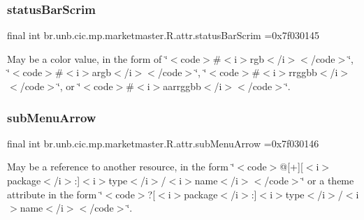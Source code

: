 \subsubsection{\texorpdfstring{status\+Bar\+Scrim}{statusBarScrim}}
{\footnotesize\ttfamily final int br.\+unb.\+cic.\+mp.\+marketmaster.\+R.\+attr.\+status\+Bar\+Scrim =0x7f030145\hspace{0.3cm}{\ttfamily [static]}}

May be a color value, in the form of \char`\"{}$<$code$>$\#$<$i$>$rgb$<$/i$>$$<$/code$>$\char`\"{}, \char`\"{}$<$code$>$\#$<$i$>$argb$<$/i$>$$<$/code$>$\char`\"{}, \char`\"{}$<$code$>$\#$<$i$>$rrggbb$<$/i$>$$<$/code$>$\char`\"{}, or \char`\"{}$<$code$>$\#$<$i$>$aarrggbb$<$/i$>$$<$/code$>$\char`\"{}. \mbox{\label{classbr_1_1unb_1_1cic_1_1mp_1_1marketmaster_1_1R_1_1attr_a203f41e3c737b654f5fac02a345e4d59}} 
\subsubsection{\texorpdfstring{sub\+Menu\+Arrow}{subMenuArrow}}
{\footnotesize\ttfamily final int br.\+unb.\+cic.\+mp.\+marketmaster.\+R.\+attr.\+sub\+Menu\+Arrow =0x7f030146\hspace{0.3cm}{\ttfamily [static]}}

May be a reference to another resource, in the form \char`\"{}$<$code$>$@\mbox{[}+\mbox{]}\mbox{[}$<$i$>$package$<$/i$>$\+:\mbox{]}$<$i$>$type$<$/i$>$/$<$i$>$name$<$/i$>$$<$/code$>$\char`\"{} or a theme attribute in the form \char`\"{}$<$code$>$?\mbox{[}$<$i$>$package$<$/i$>$\+:\mbox{]}$<$i$>$type$<$/i$>$/$<$i$>$name$<$/i$>$$<$/code$>$\char`\"{}. \mbox{\label{classbr_1_1unb_1_1cic_1_1mp_1_1marketmaster_1_1R_1_1attr_a5df1223af7cb6acd3a89ebc39ec0a418}} 

